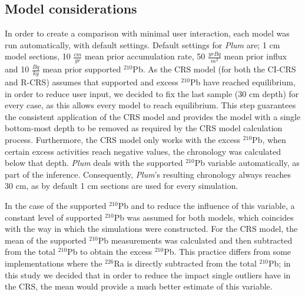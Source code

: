 \documentclass [10pt] {article}
\begin{document}
\subsection{Model considerations}
In order to create a comparison with minimal user interaction, each model was run automatically, with default settings.
Default settings for \textit{Plum} are; 1 cm model sections, 10 $\frac{cm}{yr}$ mean prior accumulation rate, 50 $\frac{yr Bq}{m^2}$ mean prior influx and 10 $\frac{Bq}{kg}$ mean prior supported $^{210}$Pb.
As the CRS model (for both the CI-CRS and R-CRS) assumes that supported and excess $^{210}$Pb have reached equilibrium, in order to reduce user input, we decided to fix the last sample (30 cm depth) for every case, as this allows every model to reach equilibrium. This step guarantees the consistent application of the CRS model and provides the model with a single bottom-most depth to be removed as required by the CRS model calculation process. 
Furthermore, the CRS model only works with the excess $^{210}$Pb, when certain excess activities reach negative values, the chronology was calculated below that depth.
\textit{Plum} deals with the supported $^{210}$Pb variable automatically, as part of the inference.
Consequently, \textit{Plum}'s resulting chronology always reaches 30 cm, as by default 1 cm sections are used for every simulation.

In the case of the supported $^{210}$Pb and to reduce the influence of this variable, %
a constant level of supported $^{210}$Pb was assumed for both models, which coincides with the way in which the simulations were constructed.
For the CRS model, the mean of the supported $^{210}$Pb measurements was calculated and then subtracted from the total $^{210}$Pb to obtain the excess $^{210}$Pb.
This practice differs from some implementations where the $^{226}$Ra is directly subtracted from the total $^{210}$Pb; in this study we decided that in order to reduce the impact single outliers have in the CRS, the mean would provide a much better estimate of this variable.


\end{document}
